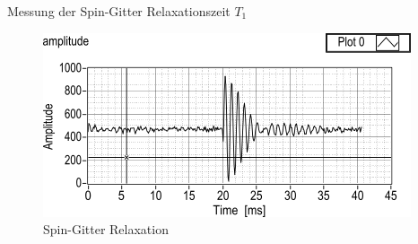 \begin{frame}
Messung der Spin-Gitter Relaxationszeit $T_1$
	\begin{figure}
	\centering
	\includegraphics[scale=.65]{images//spinlattice.png}
	\caption{Spin-Gitter Relaxation \cite{script_nmr}}
	\end{figure}
\end{frame}


